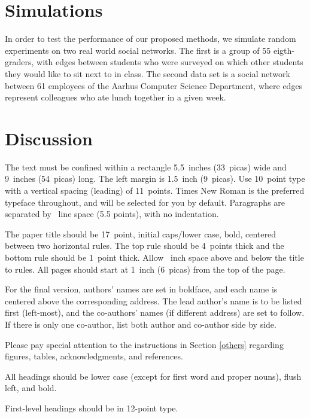 \documentclass{article}
\begin{document}

\section{Simulations}

In order to test the performance of our proposed methods, we simulate random experiments on two real world social networks. The first is a group of 55 eigth-graders, with edges between 
students who were surveyed on which other students they would like to sit next to in class. The second data set is a social network between 61 employees of the Aarhus Computer Science Department, where 
edges represent colleagues who ate lunch together in a given week. 

\section{Discussion}

The text must be confined within a rectangle 5.5~inches (33~picas) wide and
9~inches (54~picas) long. The left margin is 1.5~inch (9~picas).  Use 10~point
type with a vertical spacing (leading) of 11~points.  Times New Roman is the
preferred typeface throughout, and will be selected for you by default.
Paragraphs are separated by ~line space (5.5 points), with no
indentation.


The paper title should be 17~point, initial caps/lower case, bold, centered
between two horizontal rules. The top rule should be 4~points thick and the
bottom rule should be 1~point thick. Allow ~inch space above and
below the title to rules. All pages should start at 1~inch (6~picas) from the
top of the page.


For the final version, authors' names are set in boldface, and each name is
centered above the corresponding address. The lead author's name is to be listed
first (left-most), and the co-authors' names (if different address) are set to
follow. If there is only one co-author, list both author and co-author side by
side.


Please pay special attention to the instructions in Section \ref{others}
regarding figures, tables, acknowledgments, and references.

\label{headings}


All headings should be lower case (except for first word and proper nouns),
flush left, and bold.


First-level headings should be in 12-point type.
\end{document}

